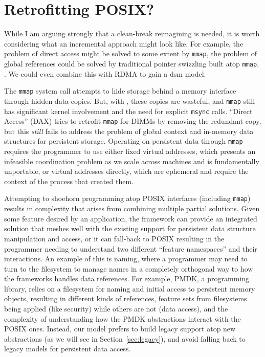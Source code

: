 \section{Retrofitting POSIX?}

While I am arguing strongly that a clean-break reimagining is needed, it is worth considering what an incremental
approach might look like. For example, the problem of direct access might be solved to some extent by \texttt{mmap}, the
problem of global references could be solved by traditional pointer swizzling built atop \texttt{mmap}, \etc. We could
even combine this with RDMA to gain a \ac{dsm} model.

The \texttt{mmap} system call attempts to hide storage behind a memory interface through hidden
data copies. But, with \NVM, these copies are wasteful, and \texttt{mmap} still has significant kernel
involvement and the need for explicit \texttt{msync} calls. ``Direct Access'' (DAX)
tries to retrofit \texttt{mmap} for \NVM DIMMs by removing the redundant copy, but this \emph{still}
fails to address the problem of global context and in-memory data structures for persistent storage.
Operating on persistent data through \texttt{mmap} requires the programmer to
use either fixed virtual addresses, which presents an infeasible coordination problem
as we scale across machines and is fundamentally unportable, or virtual addresses directly, which are ephemeral and require the
context of the process that created them.

Attempting to shoehorn \NVM programming atop POSIX interfaces (including \texttt{mmap}) results in
complexity that arises from combining multiple partial solutions. Given some feature desired by an
application, the \NVM framework can provide an integrated solution that meshes
well with the existing support for persistent data structure manipulation and access, or it can
fall-back to POSIX resulting in the programmer needing to understand two different ``feature
namespaces'' and their interactions. An example of this is naming, where a programmer may need
to turn to the filesystem to manage names in a completely orthogonal way to how the \NVM frameworks handles
data references. For example, PMDK, a \NVM programming library, relies on a filesystem for naming and initial access to
persistent memory objects, resulting in different kinds of references, feature sets from filesystems
being applied (like security) while others are not (data access), and the complexity of
understanding how the PMDK abstractions interact with the POSIX ones. Instead, our model prefers to
build legacy support atop new abstractions (as we will see in Section~\ref{sec:legacy}), and avoid falling back to legacy
models for persistent data access.

